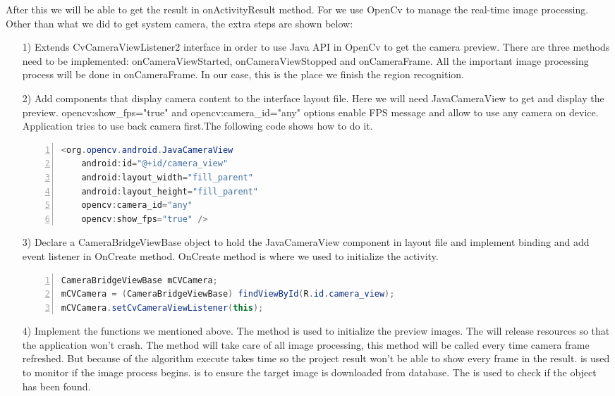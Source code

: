 \par After this we will be able to get the result in onActivityResult method. For  we use OpenCv to manage the real-time image processing. Other than what we did to get system camera, the extra steps are shown below:
\begin{enumerate}
\item[1)] Extends CvCameraViewListener2 interface in order to use Java API in OpenCv to get the camera preview. There are three methods need to be implemented: onCameraViewStarted, onCameraViewStopped and onCameraFrame. All the important image processing process will be done in onCameraFrame. In our case, this is the place we finish the region recognition.
\item[2)] Add components that display camera content to the interface layout file. Here we will need JavaCameraView to get and display the preview. opencv:show\_fps="true" and opencv:camera\_id="any" options enable FPS message and allow to use any camera on device. Application tries to use back camera first.The following code shows how to do it.
\begin{lstlisting}[caption={Usage of OpenCv Camera},language={java},
        numbers=left,basicstyle=\footnotesize\ttfamily,breaklines=true,xleftmargin=.15\textwidth, xrightmargin=.15\textwidth] 
<org.opencv.android.JavaCameraView
    android:id="@+id/camera_view"
    android:layout_width="fill_parent"
    android:layout_height="fill_parent"
    opencv:camera_id="any"
    opencv:show_fps="true" />
\end{lstlisting}
\item[3)] Declare a CameraBridgeViewBase object to hold the JavaCameraView component in layout file and implement binding and add event listener in OnCreate method. OnCreate method is where we used to initialize the activity.
\begin{lstlisting}[caption={Declare a CameraBridgeViewBase Object},language={java},
        numbers=left,basicstyle=\footnotesize\ttfamily,breaklines=true,xleftmargin=.05\textwidth, xrightmargin=.05\textwidth] 
CameraBridgeViewBase mCVCamera;
mCVCamera = (CameraBridgeViewBase) findViewById(R.id.camera_view);
mCVCamera.setCvCameraViewListener(this);
\end{lstlisting}
\item[4)] Implement the functions we mentioned above. The  method is used to initialize the preview images. The  will release resources so that the application won't crash. The  method will take care of all image processing, this method will be called every time camera frame refreshed. But because of the algorithm execute takes time so the project result won't be able to show every frame in the result.  is used to monitor if the image process begins.  is to ensure the target image is downloaded from database. The  is used to check if the object has been found.

\end{enumerate}
